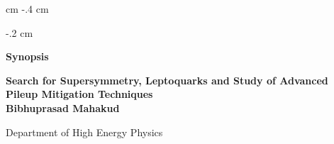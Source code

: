 \setcounter{section}{0}
\setcounter{subsection}{0}
\setcounter{subsubsection}{0}
\setcounter{equation}{0}
\setcounter{page}{1}    %
 cm 
\evensidemargin -.4 cm


\evensidemargin -.2 cm


{\Large \bf Synopsis}

\newpage

\begin{titlepage}






 

\begin{center}
{ \huge \bfseries Search for Supersymmetry, Leptoquarks and Study of Advanced Pileup Mitigation Techniques}\\[0.4cm] %
 


\vspace{1cm}
{\bf Bibhuprasad Mahakud}


\vspace{0.5cm}
Department of High Energy Physics


\end{center}
\end{titlepage}
